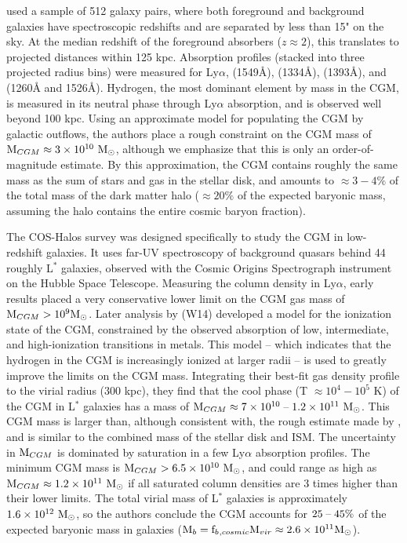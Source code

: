 \citet{Steidel2010} used a sample of 512 galaxy pairs, where both
foreground and background galaxies have spectroscopic redshifts and
are separated by less than 15" on the sky. At the median redshift of
the foreground absorbers ($z\approx 2$), this translates to projected
distances within 125 kpc. Absorption profiles (stacked into three
projected radius bins) were measured for Ly$\alpha$, 
(1549\AA),  (1334\AA),  (1393\AA), and
(1260\AA{} and 1526\AA). Hydrogen, the most dominant
element by mass in the CGM, is measured in its neutral phase through
Ly$\alpha$ absorption, and is observed well beyond 100 kpc. Using an
approximate model for populating the CGM by galactic outflows, the
authors place a rough constraint on the CGM mass of $\textrm{M}{}_{CGM}
\approx 3\times 10^{10}~\textrm{M}_\odot{}$, although we emphasize that this is only
an order-of-magnitude estimate. By this approximation, the CGM
contains roughly the same mass as the sum of stars and gas in the
stellar disk, and amounts to $\approx 3-4\%$ of the total mass of the
dark matter halo ($\approx 20\%$ of the expected baryonic mass,
assuming the halo contains the entire cosmic baryon fraction).

The COS-Halos survey \citep{Tumlinson2011} was designed specifically
to study the CGM in low-redshift galaxies. It uses far-UV spectroscopy
of background quasars behind 44 roughly L$^*$ galaxies, observed
with the Cosmic Origins Spectrograph instrument on the Hubble Space
Telescope. Measuring the column density in Ly$\alpha$, early results
\citep{Thom2012,Werk2013} placed a very conservative lower limit on
the CGM gas mass of $\textrm{M}{}_{CGM} > 10^9 \textrm{M}_\odot{}$. Later analysis by
\textbf{\citet{Werk2014}} (W14) developed a model for the ionization
state of the CGM, constrained by the observed absorption of low,
intermediate, and high-ionization transitions in metals. This model --
which indicates that the hydrogen in the CGM is increasingly ionized
at larger radii -- is used to greatly improve the limits on the CGM
mass. Integrating their best-fit gas density profile to the virial
radius (300 kpc), they find that the cool phase (T $\approx 10^4 -
10^5$ K) of the CGM in L$^*$ galaxies has a mass of $\textrm{M}{}_{CGM}
\approx 7\times 10^{10}\;\textrm{--}\;1.2\times 10^{11}~\textrm{M}_\odot{}$. This CGM mass is
larger than, although consistent with, the rough estimate made by
\citet{Steidel2010}, and is similar to the combined mass of the
stellar disk and ISM. The uncertainty in $\textrm{M}{}_{CGM}$ is dominated
by saturation in a few Ly$\alpha$ absorption profiles. The minimum CGM
mass is $\textrm{M}{}_{CGM} > 6.5\times 10^{10} ~\textrm{M}_\odot$, and could range as
high as $\textrm{M}{}_{CGM} \approx 1.2\times 10^{11}~\textrm{M}_\odot{}$ if all saturated
column densities are 3 times higher than their lower limits. The total
virial mass of L$^*$ galaxies is approximately $1.6\times 10^{12}~\textrm{M}_\odot{}$,
so the authors conclude the CGM accounts for $25\;\textrm{--}\;45\%$ of the
expected baryonic mass in galaxies ($\textrm{M}{}_{b} = \textrm{f\ensuremath{_b}}{}_{,cosmic}
\textrm{M\ensuremath{_{vir}}}{} \approx 2.6\times 10^{11} \textrm{M}_\odot{}$).

